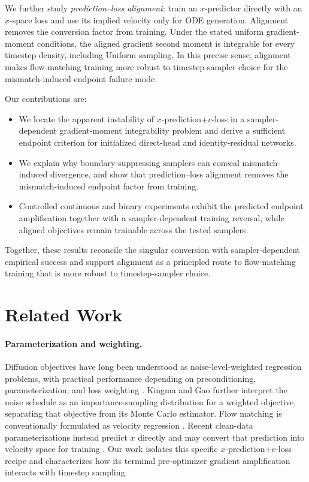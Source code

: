 \documentclass{article}
\theoremstyle{plain}
\theoremstyle{definition}
\theoremstyle{remark}
\begin{document}
We further study \emph{prediction--loss alignment}: train an $x$-predictor directly with an $x$-space loss and use its implied velocity only for ODE generation. Alignment removes the conversion factor from training. Under the stated uniform gradient-moment conditions, the aligned gradient second moment is integrable for every timestep density, including Uniform sampling. In this precise sense, alignment makes flow-matching training more robust to timestep-sampler choice for the mismatch-induced endpoint failure mode.

Our contributions are:
\begin{itemize}
    \item We locate the apparent instability of $x$-prediction+$v$-loss in a sampler-dependent gradient-moment integrability problem and derive a sufficient endpoint criterion for initialized direct-head and identity-residual networks.
    \item We explain why boundary-suppressing samplers can conceal mismatch-induced divergence, and show that prediction--loss alignment removes the mismatch-induced endpoint factor from training.
    \item Controlled continuous and binary experiments exhibit the predicted endpoint amplification together with a sampler-dependent training reversal, while aligned objectives remain trainable across the tested samplers.
\end{itemize}

Together, these results reconcile the singular conversion with sampler-dependent empirical success and support alignment as a principled route to flow-matching training that is more robust to timestep-sampler choice.

\section{Related Work}
\label{sec:related}

\paragraph{Parameterization and weighting.}
Diffusion objectives have long been understood as noise-level-weighted regression problems, with practical performance depending on preconditioning, parameterization, and loss weighting \citep{ho2020denoising,karras2022edm,kingma2023understanding,hang2023minsnr}. Kingma and Gao further interpret the noise schedule as an importance-sampling distribution for a weighted objective, separating that objective from its Monte Carlo estimator. Flow matching is conventionally formulated as velocity regression \citep{lipmanflow,liurflow}. Recent clean-data parameterizations instead predict $x$ directly and may convert that prediction into velocity space for training \citep{li2025back,hu2026elf}. Our work isolates this specific $x$-prediction+$v$-loss recipe and characterizes how its terminal pre-optimizer gradient amplification interacts with timestep sampling.
\end{document}
